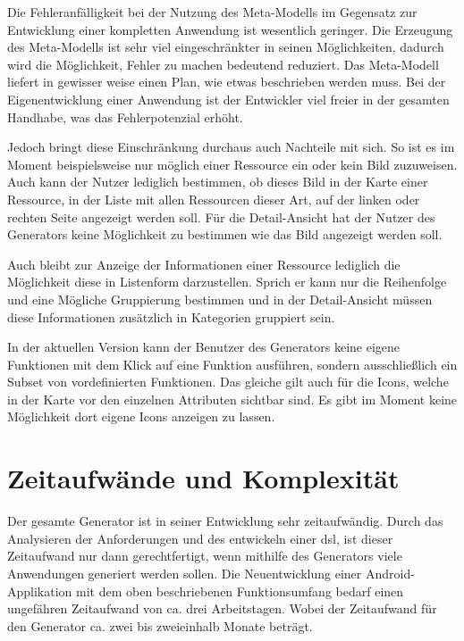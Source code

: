 Die Fehleranfälligkeit bei der Nutzung des Meta-Modells im Gegensatz zur Entwicklung einer kompletten Anwendung ist wesentlich geringer. Die Erzeugung des Meta-Modells ist sehr viel eingeschränkter in seinen Möglichkeiten, dadurch wird die Möglichkeit, Fehler zu machen bedeutend reduziert. Das Meta-Modell liefert in gewisser weise einen Plan, wie etwas beschrieben werden muss. Bei der Eigenentwicklung einer Anwendung ist der Entwickler viel freier in der gesamten Handhabe, was das Fehlerpotenzial erhöht.

\newpage

Jedoch bringt diese Einschränkung durchaus auch Nachteile mit sich. So ist es im Moment beispielsweise nur möglich einer Ressource ein oder kein Bild zuzuweisen. Auch kann der Nutzer lediglich bestimmen, ob dieses Bild in der Karte einer Ressource, in der Liste mit allen Ressourcen dieser Art, auf der linken oder rechten Seite angezeigt werden soll. Für die Detail-Ansicht hat der Nutzer des Generators keine Möglichkeit zu bestimmen wie das Bild angezeigt werden soll.

Auch bleibt zur Anzeige der Informationen einer Ressource lediglich die Möglichkeit diese in Listenform darzustellen. Sprich er kann nur die Reihenfolge und eine Mögliche Gruppierung bestimmen und in der Detail-Ansicht müssen diese Informationen zusätzlich in Kategorien gruppiert sein. 

In der aktuellen Version kann der Benutzer des Generators keine eigene Funktionen mit dem Klick auf eine Funktion ausführen, sondern ausschließlich ein Subset von vordefinierten Funktionen. Das gleiche gilt auch für die Icons, welche in der Karte vor den einzelnen Attributen sichtbar sind. Es gibt im Moment keine Möglichkeit dort eigene Icons anzeigen zu lassen.

\section{Zeitaufwände und Komplexität}

Der gesamte Generator ist in seiner Entwicklung sehr zeitaufwändig. Durch das Analysieren der Anforderungen und des entwickeln einer \acf{dsl}, ist dieser Zeitaufwand nur dann gerechtfertigt, wenn mithilfe des Generators viele Anwendungen generiert werden sollen. Die Neuentwicklung einer Android-Applikation mit dem oben beschriebenen Funktionsumfang bedarf einen ungefähren Zeitaufwand von ca. drei Arbeitstagen. Wobei der Zeitaufwand für den Generator ca. zwei bis zweieinhalb Monate beträgt.

